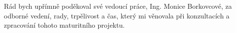 Rád bych upřímně poděkoval své vedoucí práce, Ing. Monice Borkovcové, za odborné vedení, rady, trpělivost a čas, který mi věnovala při konzultacích a zpracování tohoto maturitního projektu.
